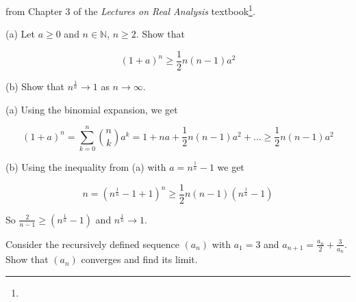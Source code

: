  from Chapter 3 of the \textit{Lectures on Real Analysis} textbook\footnote{}.

\begin{tcolorbox}[title={Exercise 3.17, page 35}]
(a) Let $a \geq 0$ and $n \in \mathbb{N}$, $n \geq 2$. Show that 

$$
(1 + a)^n \geq \frac{1}{2} n (n -1)a^2
$$

(b) Show that $n^{\frac{1}{n}} \to 1$ as $n \to \infty$.
\end{tcolorbox}

\begin{solution}
(a) Using the binomial expansion, we get

$$
(1 + a)^n = \sum_{k = 0}^n \binom{n}{k} a^k = 1 + n a + \frac{1}{2} n (n -1)a^2 + \ldots \geq \frac{1}{2} n (n -1)a^2
$$

(b) Using the inequality from (a) with $a = n^{\frac{1}{n}} - 1$ we get

$$
n = (n^{\frac{1}{n}} - 1 + 1)^n \geq \frac{1}{2} n (n -1) (n^{\frac{1}{n}} - 1)
$$

So $\frac{2}{n-1} \geq (n^{\frac{1}{n}} - 1)$ and $n^{\frac{1}{n}} \to 1$.
\end{solution}

\begin{tcolorbox}[title={Exercise 3.18, page 35}]
Consider the recursively defined sequence $(a_n)$ with $a_1 = 3$ and $a_{n+1}=\frac{a_n}{2} + \frac{3}{a_n}$. Show that $(a_n)$ converges and find its limit.
\end{tcolorbox}

